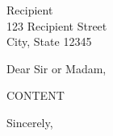 \documentclass{letter}
\begin{document}
\begin{letter}{Recipient\\123 Recipient Street\\City, State 12345}
\opening{Dear Sir or Madam,}

{{CONTENT}}

\closing{Sincerely,}

\end{letter}
\end{document}

